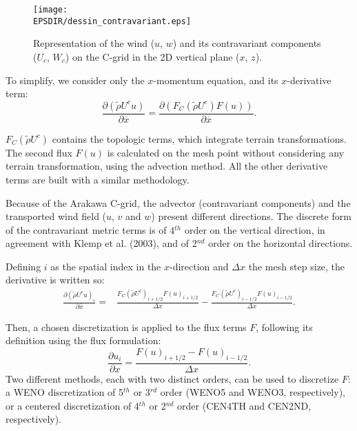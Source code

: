 \begin{figure}[ht]
\centering
	\texttt{[image: \\EPSDIR/dessin\_contravariant.eps]}
	 \caption{Representation of the wind ($u$, $w$) and its contravariant components ($U_c$, $W_c$) on the C-grid in the 2D vertical plane ($x$, $z$).}
 \label{fig:contrav}
\end{figure}

To simplify, we consider only the $x$-momentum equation, and its $x$-derivative term:
\begin{equation}
 \frac{\partial (\tilde{\rho} U^{c} u)}{\partial \overline{x}} = \frac{\partial (F_C(\tilde{\rho} U^{c})F(u))}{\partial \overline{x}}.
 \label{eq:flux-form}
\end{equation}

 $F_C(\tilde{\rho} U^{c})$ contains the topologic terms, which integrate terrain transformations. The second flux $F(u)$ is calculated on the mesh point without considering any terrain transformation, using the advection method. All the other derivative terms are built with a similar methodology.
 
Because of the Arakawa C-grid, the advector (contravariant components) and the transported wind field ($u$, $v$ and $w$) present different directions. 
The discrete form of the contravariant metric terms is of 4$^{th}$ order on the vertical direction, in agreement with Klemp et al. (2003), and of 2$^{nd}$ order on the horizontal directions. 

Defining $i$ as the spatial index in the $x$-direction and $\Delta x$ the mesh step size, the derivative is written so:
\begin{equation}
\begin{split}
 \frac{\partial (\tilde{\rho} U^{c} u)_i}{\partial \overline{x}} =& \frac{F_C(\tilde{\rho} U^{c})_{i+1/2} F(u)_{i+1/2}}{\Delta x} 
 - \frac{F_C(\tilde{\rho} U^{c})_{i-1/2} F(u)_{i-1/2}}{\Delta x}.
 \label{eq:flux-form-num}
\end{split}
\end{equation}

Then, a chosen discretization is applied to the flux terms $F$, following its definition using the flux formulation:
\begin{equation}
	\frac{\partial u_i}{\partial x} = \frac{F(u)_{i+1/2}-F(u)_{i-1/2}}{\Delta x}.
	\label{eq:discr_op}
\end{equation}
Two different methods, each with two distinct orders, can be used to discretize $F$: a WENO discretization of 5$^{th}$ or 3$^{rd}$ order (WENO5 and WENO3, respectively), or a centered discretization of 4$^{th}$ or 2$^{nd}$ order (CEN4TH and CEN2ND, respectively).

